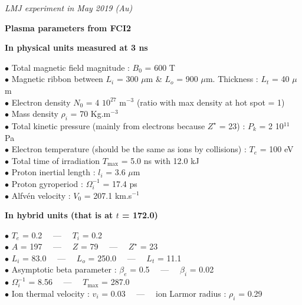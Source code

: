 \documentclass{report}
\begin{document}
{\it
LMJ experiment in May 2019 (Au)}

\bigskip

\begin{center}
{\large
\bf
Plasma parameters from FCI2\\[0.2cm]
}
{\it }
\end{center}

\bigskip

{\bf In physical units measured at 3 ns}

\smallskip

$\bullet$ Total magnetic field magnitude : $B_0$ = 600 T \\
$\bullet$ Magnetic ribbon between $L_i$ = 300 $\mu$m \& $L_o$ = 900 $\mu$m. Thickness : $L_t$ = 40 $\mu$m \\
$\bullet$ Electron density $N_0$ = 4 $10^{27}$ m$^{-3}$ (ratio with max density at hot spot = 1) \\
$\bullet$ Mass density $\rho_i$ = 70 Kg.m$^{-3}$ \\
$\bullet$ Total kinetic pressure (mainly from electrons because $Z^{\star}$ = 23) : $P_k$ = 2 10$^{11}$ Pa \\
$\bullet$ Electron temperature (should be the same as ions by collisions) : $T_e$ = 100 eV \\
$\bullet$ Total time of irradiation $T_{\max}$ = 5.0 ns with 12.0 kJ \\
$\bullet$ Proton inertial length : $l_i$ = 3.6 $\mu$m \\
$\bullet$ Proton gyroperiod : $\Omega_i^{-1}$ = 17.4 ps \\
$\bullet$ Alfvén velocity : $V_0$ = 207.1 km.s$^{-1}$ \\

\medskip

{\bf In hybrid units (that is at $t$ = 172.0)}

\smallskip

$\bullet$ $T_e$ = 0.2 \ \ --- \ \ $T_i$ = 0.2 \\
$\bullet$ $A$ = 197 \ \ --- \ \ $Z$ = 79 \ \ --- \ \ $Z^{\star}$ = 23 \\
$\bullet$ $L_i$ = 83.0 \ \ --- \ \ $L_o$ = 250.0 \ \ --- \ \ $L_t$ = 11.1 \\
$\bullet$ Asymptotic beta parameter : $\beta_e$ = 0.5 \ \ --- \ \ $\beta_i$ = 0.02 \\
$\bullet$ $\Omega_i^{-1}$ = 8.56 \ \ --- \ \ $T_{\max}$ = 287.0 \\
$\bullet$ Ion thermal velocity : $v_i$ = 0.03 \ \ --- \ \ ion Larmor radius : $\rho_i$ = 0.29 \\
\end{document}

